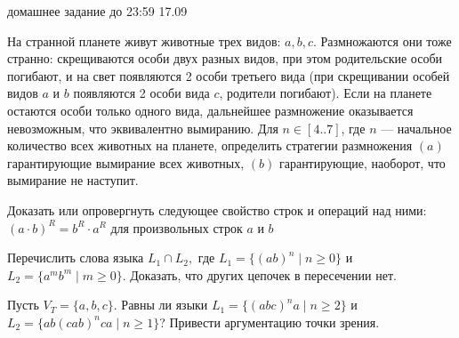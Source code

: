 \documentclass[12pt]{article}
\begin{document}

{\Large домашнее задание до 23:59 17.09}
\bigskip

\enumerate
{
  \item 
  {   
     На странной планете живут животные трех видов: $a, b, c$. Размножаются они тоже странно: скрещиваются особи двух разных видов, при этом родительские особи погибают, и на свет появляются 2 особи третьего вида (при скрещивании особей видов $a$ и $b$ появляются 2 особи вида $c$, родители погибают). Если на планете остаются особи только одного вида, дальнейшее размножение оказывается невозможным, что эквивалентно вымиранию. Для $n \in [4..7]$, где $n$ --- начальное количество всех животных на планете, определить стратегии размножения $(a)$ гарантирующие вымирание всех животных, $(b)$ гарантирующие, наоборот, что вымирание не наступит.
  }
  \item 
  {
     Доказать или опровергнуть следующее свойство строк и операций над ними: \\ $(a \cdot b)^R = b^R \cdot a^R$ для произвольных строк $a$ и $b$
  }
  \item
  {
    Перечислить слова языка $L_1 \cap L_2,$ где $L_1 = \{ (ab)^n \mid n \geq 0 \}$ и $L_2 = \{ a^m b^m \mid m \geq 0 \}$. Доказать, что других цепочек в пересечении нет. 
  }
  \item
  {
    Пусть $V_T = \{a,b,c\}$. Равны ли языки $L_1 = \{ (abc)^n a \mid n \geq 2 \}$ и $L_2 = \{ ab (cab)^n ca \mid n \geq 1 \}$? Привести аргументацию точки зрения. 
  }
}
\end{document}
